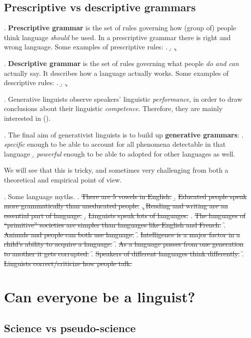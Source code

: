 \documentclass[11pt, oneside]{article}   	%
\begin{document}
\subsection{Prescriptive vs descriptive grammars}

\ex. {\bfseries Prescriptive grammar} is the set of rules governing how (group of) people think language {\itshape should} be used. In a prescriptive grammar there is right and wrong language. Some examples of prescriptive rules:
\a.
\b.
\c.

\ex. {\bfseries Descriptive grammar} is the set of rules governing what people {\itshape do and can} actually say. It describes how a language actually works. Some examples of descriptive rules:
\a.
\b.
\c.

\ex. Generative linguists observe speakers' linguistic {\itshape performance}, in order to draw conclusions about their linguistic {\itshape competence}. Therefore, they are mainly interested in (\underline{\hspace{0.5cm}}).

\ex. The final aim of generativist linguists is to build up {\bfseries generative grammars}:
\a. {\itshape specific}  enough to be able to account for all phenomena detectable in that language
\b. {\itshape powerful} enough to be able to adopted for other languages as well.

We will see that this is tricky, and sometimes very challenging from both a theoretical and empirical point of view.

\ex. Some language myths.
\a. \sout{There are 5 vowels in English.}
\b. \sout{Educated people speak more grammatically than uneducated people.}
\c. \sout{Reading and writing are an essential part of language.}
\d. \sout{Linguists speak lots of languages.}
\e. \sout{The languages of ``primitive'' societies are simpler than languages like English and French.}
\f. \sout{Animals and people can both use language.}
\f. \sout{Intelligence is a major factor in a child's ability to acquire a language.}
\f. \sout{As a language passes from one generation to another it gets corrupted.}
\f. \sout{Speakers of different languages think differently.}
\f. \sout{Linguists correct/criticize how people talk.}

\section{Can everyone be a linguist?}

\subsection{Science vs pseudo-science}
\end{document}
